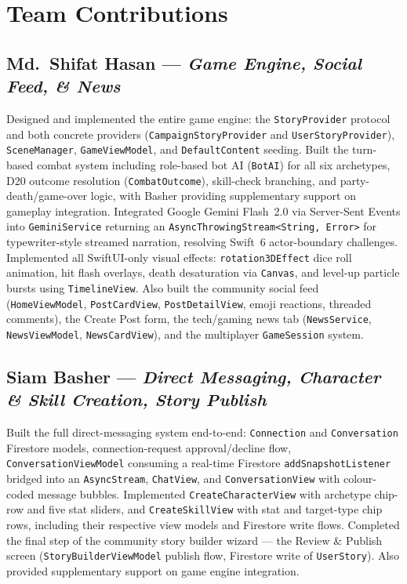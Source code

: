 \documentclass[12pt,a4paper]{article}
\begin{document}
\section{Team Contributions}

\begin{sloppypar}
\subsection*{Md.\ Shifat Hasan — \textit{Game Engine, Social Feed, \& News}}

Designed and implemented the entire game engine: the \texttt{StoryProvider} protocol and both concrete providers (\texttt{CampaignStoryProvider} and \texttt{UserStoryProvider}), \texttt{SceneManager}, \texttt{GameViewModel}, and \texttt{DefaultContent} seeding. Built the turn-based combat system including role-based bot AI (\texttt{BotAI}) for all six archetypes, D20 outcome resolution (\texttt{CombatOutcome}), skill-check branching, and party-death/game-over logic, with Basher providing supplementary support on gameplay integration. Integrated Google Gemini Flash~2.0 via Server-Sent Events into \texttt{GeminiService} returning an \texttt{AsyncThrowingStream<String, Error>} for typewriter-style streamed narration, resolving Swift~6 actor-boundary challenges. Implemented all SwiftUI-only visual effects: \texttt{rotation3DEffect} dice roll animation, hit flash overlays, death desaturation via \texttt{Canvas}, and level-up particle bursts using \texttt{TimelineView}. Also built the community social feed (\texttt{HomeViewModel}, \texttt{PostCardView}, \texttt{PostDetailView}, emoji reactions, threaded comments), the Create Post form, the tech/gaming news tab (\texttt{NewsService}, \texttt{NewsViewModel}, \texttt{NewsCardView}), and the multiplayer \texttt{GameSession} system.

\subsection*{Siam Basher — \textit{Direct Messaging, Character \& Skill Creation, Story Publish}}

Built the full direct-messaging system end-to-end: \texttt{Connection} and \texttt{Conversation} Firestore models, connection-request approval/decline flow, \texttt{ConversationViewModel} consuming a real-time Firestore \texttt{addSnapshotListener} bridged into an \texttt{AsyncStream}, \texttt{ChatView}, and \texttt{ConversationView} with colour-coded message bubbles. Implemented \texttt{CreateCharacterView} with archetype chip-row and five stat sliders, and \texttt{CreateSkillView} with stat and target-type chip rows, including their respective view models and Firestore write flows. Completed the final step of the community story builder wizard — the Review \& Publish screen (\texttt{StoryBuilderViewModel} publish flow, Firestore write of \texttt{UserStory}). Also provided supplementary support on game engine integration.


\end{sloppypar}
\end{document}
